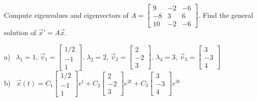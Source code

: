 \begin{exercise}
\leavevmode
\begin{tasks}
\task
Compute eigenvalues and eigenvectors of
$A = \left[ \begin{smallmatrix}
9 & -2 & -6 \\
-8 & 3 & 6 \\
10 & -2 & -6
\end{smallmatrix} \right]$.
\task
Find the general solution of ${\vec{x}}' = A \vec{x}$.
\end{tasks}
\end{exercise}
\comboSol{%
}
{%
a)~ $\lambda_1 = 1$, $\vec{v}_1 = \left[\begin{smallmatrix} 1/2 \\ -1 \\ 1 \end{smallmatrix}\right]$. $\lambda_2 = 2$, $\vec{v}_2 = \left[\begin{smallmatrix} 2 \\ -2 \\ 3 \end{smallmatrix}\right]$. $\lambda_3 = 3$, $\vec{v}_3 = \left[\begin{smallmatrix} 3 \\ -3 \\ 4 \end{smallmatrix}\right]$ \\
b)~ $\vec{x}(t) = C_1\left[\begin{smallmatrix} 1/2 \\ -1 \\ 1 \end{smallmatrix}\right]e^t + C_2\left[\begin{smallmatrix} 2 \\ -2 \\ 3 \end{smallmatrix}\right]e^{2t} + C_3\left[\begin{smallmatrix} 3 \\ -3 \\ 4 \end{smallmatrix}\right]e^{3t}$
}

